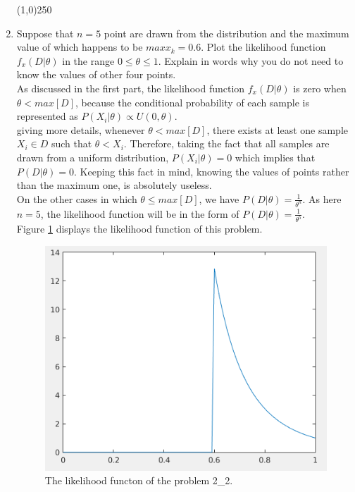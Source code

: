\documentclass[12pt]{article}
\begin{document}
\begin{enumerate}
\begin{center}
\line(1,0){250}
\end{center}
\item Suppose that $n = 5$ point are drawn from the distribution and the maximum value
of which happens to be $max x_k = 0.6$. Plot the likelihood function $f_x(D|\theta)$ in the
range $0 \leq \theta \leq 1$. Explain in words why you do not need to know the values of
other four points.\\
As discussed in the first part, the likelihood function $f_x(D|\theta)$ is zero when $\theta < max[D]$, because the conditional probability of each sample is represented as $P(X_i|\theta) \propto U(0,\theta)$. \\
giving more details, whenever $\theta < max[D]$, there exists at least one sample $X_i \in D$ such that $\theta < X_i$. Therefore, taking the fact that all samples are drawn from a uniform distribution, $P(X_i | \theta ) = 0$ which implies that $P(D|\theta) = 0$. Keeping this fact in mind, knowing the values of points rather than the maximum one, is absolutely useless.\\
On the other cases in which $\theta \leq max[D]$, we have $P(D|\theta) = \frac{1}{\theta^n}$. As here $n = 5$, the likelihood function will be in the form of $P(D|\theta) = \frac{1}{\theta^5}$. \\
Figure \ref{fig:2-2} displays the likelihood function of this problem.
\begin{figure}[h]
\centering
\includegraphics[scale=0.4]{Imgs/2-2.png}
\caption{The likelihood functon of the problem 2\_2.}
\label{fig:2-2}
\end{figure}

\end{enumerate}
\end{document}
